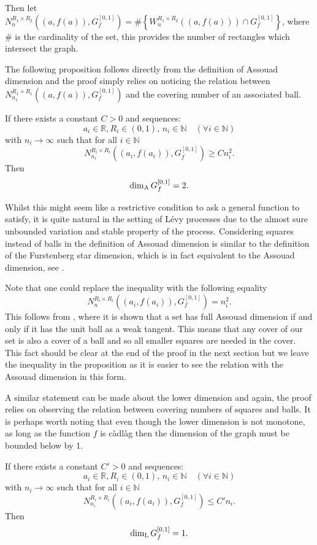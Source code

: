Then let $N_{n}^{R_1 \times R_2 }((a,f(a)),G_f^{[0,1]})= \# \left\{ W_{n}^{R_1\times R_2}((a,f(a))) \cap G_f^{[0,1]} \right\}$, where $\#$ is the cardinality of the set, this provides the number of rectangles which intersect the graph.


The following proposition follows directly from the definition of Assouad dimension and the proof simply relies on noticing the relation between \newline$N_{n_1}^{R_1 \times R_1 }((a,f(a)),G_f^{[0,1]})$ and the covering number of an associated ball.


\begin{proposition}\label{graph}
	If there exists a constant $C>0$ and sequences:
	\[
	a_i\in \mathbb{R},R_i\in (0,1),\, n_i\in\mathbb{N} \quad (\forall i\in \mathbb{N})
	\]
	with $n_i \rightarrow \infty$ such that for all $i\in\mathbb{N}$
	\[
	N_{n_i}^{R_i \times R_i }((a_i,f(a_i)),G_f^{[0,1]})\geq C n_i^2.
	\]
	Then
	\[
	\dim_{\textup{A}} G_f^{[0,1]}=2.
	\]
\end{proposition}

Whilst this might seem like a restrictive condition to ask a general function to satisfy, it is quite natural in the setting of L\'evy processes due to the almost sure unbounded variation and stable property of the process. Considering squares instead of balls in the definition of Assouad dimension is similar to the definition of the Furstenberg star dimension, which is in fact equivalent to the Assouad dimension, see \cite{chenwuwu}.

Note that one could replace the inequality with the following equality
\[
N_{n}^{R_i \times R_i }((a_i,f(a_i)),G_f^{[0,1]})= n_i^2.
\]
This follows from \cite[Theorem 2.4]{FY}, where it is shown that a set has full Assouad dimension if and only if it has the unit ball as a weak tangent. This means that any cover of our set is also a cover of a ball and so all smaller squares are needed in the cover. This fact should be clear at the end of the proof in the next section but we leave the inequality in the proposition as it is easier to see the relation with the Assouad dimension in this form.


A similar statement can be made about the lower dimension and again, the proof relies on observing the relation between covering numbers of squares and balls. It is perhaps worth noting that even though the lower dimension is not monotone, as long as the function $f$ is c\`adl\`ag then the dimension of the graph must be bounded below by 1.
\begin{proposition}\label{graph-lower}
	If there exists a constant $C'>0$ and sequences:
	\[
	a_i\in \mathbb{R},R_i\in (0,1),\, n_i\in\mathbb{N} \quad (\forall i\in \mathbb{N})
	\]
	with $n_i \rightarrow \infty$ such that for all $i\in\mathbb{N}$
	\[
	N_{n_i}^{R_i \times R_i }((a_i,f(a_i)),G_f^{[0,1]})\leq C' n_i.
	\]
	Then
	\[
	\dim_{\textup{L}} G_f^{[0,1]}=1.
	\]
\end{proposition}

